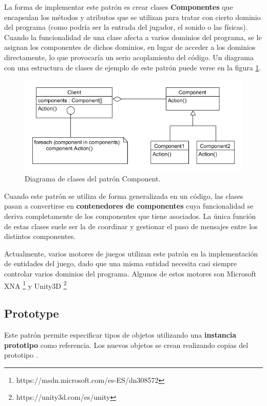 La forma de implementar este patrón es crear clases \textbf{Componentes} que encapsulan los métodos y atributos que se utilizan para tratar con cierto dominio del programa (como podría ser la entrada del jugador, el sonido o las físicas). Cuando la funcionalidad de una clase afecta a varios dominios del programa, se le asignan los componentes de dichos dominios, en lugar de acceder a los dominios directamente, lo que provocaría un serio acoplamiento del código. Un diagrama con una estructura de clases de ejemplo de este patrón puede verse en la figura \ref{component_diagram}.
\begin{figure}[h]
	\includegraphics[width=1\textwidth]{images/estructura/patrones/component}
	\centering
	\caption{Diagrama de clases del patrón Component.}
	\label{component_diagram}
\end{figure}

Cuando este patrón se utiliza de forma generalizada en un código, las clases pasan a convertirse en \textbf{contenedores de componentes} cuya funcionalidad se deriva completamente de los componentes que tiene asociados. La única función de estas clases suele ser la de coordinar y gestionar el paso de mensajes entre los distintos componentes.

Actualmente, varios motores de juegos utilizan este patrón en la implementación de entidades del juego, dado que una misma entidad necesita casi siempre controlar varios dominios del programa. Algunos de estos motores son Microsoft XNA \footnote{https://msdn.microsoft.com/es-ES/dn308572} y Unity3D \footnote{https://unity3d.com/es/unity}

\subsection{Prototype}
Este patrón permite especificar tipos de objetos utilizando una \textbf{instancia prototipo} como referencia. Los nuevos objetos se crean realizando copias del prototipo \cite{design_patterns}.

